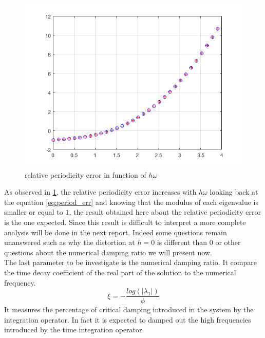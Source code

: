 \begin{figure}[H]
    \centering
    \includegraphics[scale=0.6]{images/relative_periodicity_error.png}
    \caption{relative periodicity error in function of $h\omega$}
    \label{fig:relative_per_err}
\end{figure}
As observed in \ref{fig:relative_per_err}, the relative periodicity error increases with $h \omega$ looking back at the equation \ref{eq:period_err} and knowing that the modulus of each eigenvalue is smaller or equal to $1$, the result obtained here about the relative periodicity error is the one expected. Since this result is difficult to interpret a more complete analysis will be done in the next report. Indeed some questions remain unanswered such as why the distortion at $h=0$ is different than $0$ or other questions about the numerical damping ratio we will present now. \\
The last parameter to be investigate is the numerical damping ratio. It compare the time decay coefficient of the real part of the solution to the numerical frequency.
\begin{equation}
    \xi = -\frac{log(|\lambda_1|)}{\phi}
    \label{eq:num_damp}
\end{equation}
It measures the percentage of critical damping introduced in the system by the integration operator. In fact it is expected to damped out the high frequencies introduced by the time integration operator.   
